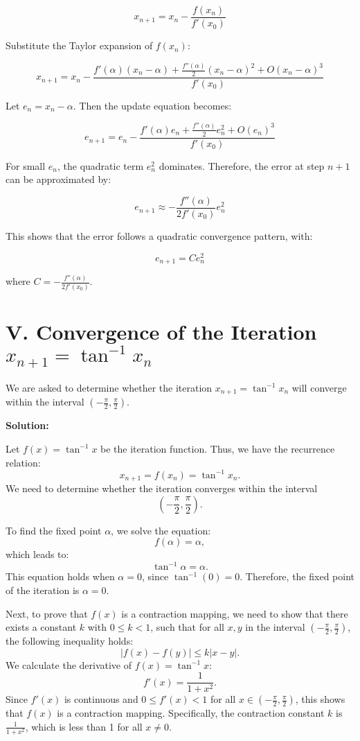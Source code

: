 \documentclass[a4paper]{article}
\begin{document}
\[
x_{n+1} = x_n - \frac{f(x_n)}{f'(x_0)}
\]

Substitute the Taylor expansion of \( f(x_n) \):

\[
x_{n+1} = x_n - \frac{f'(\alpha)(x_n - \alpha) + \frac{f''(\alpha)}{2}(x_n - \alpha)^2+ O(x_n - \alpha)^3}{f'(x_0)}
\]

Let \( e_n = x_n - \alpha \). Then the update equation becomes:

\[
e_{n+1} = e_n - \frac{f'(\alpha)e_n + \frac{f''(\alpha)}{2}e_n^2+ O(e_n)^3}{f'(x_0)}
\]


For small \( e_n \), the quadratic term \( e_n^2 \) dominates. Therefore, the error at step \( n+1 \) can be approximated by:

\[
e_{n+1} \approx - \frac{f''(\alpha)}{2 f'(x_0)} e_n^2
\]

This shows that the error follows a quadratic convergence pattern, with:

\[
e_{n+1} = C e_n^2
\]

where \( C = - \frac{f''(\alpha)}{2 f'(x_0)} \).

\section*{V. Convergence of the Iteration $x_{n+1} = \tan^{-1}x_n$}

We are asked to determine whether the iteration $x_{n+1} = \tan^{-1} x_n$ will converge within the interval $\left(-\frac{\pi}{2}, \frac{\pi}{2}\right).$


\textbf{Solution:}

Let $f(x) = \tan^{-1} x$ be the iteration function. Thus, we have the recurrence relation:
\[
x_{n+1} = f(x_n) = \tan^{-1} x_n.
\]
We need to determine whether the iteration converges within the interval 
\[
\left(-\frac{\pi}{2}, \frac{\pi}{2}\right).
\]

To find the fixed point $\alpha$, we solve the equation:
\[
f(\alpha) = \alpha,
\]
which leads to:
\[
\tan^{-1} \alpha = \alpha.
\]
This equation holds when $\alpha = 0$, since $\tan^{-1}(0) = 0$. Therefore, the fixed point of the iteration is $\alpha = 0$.

Next, to prove that $f(x)$ is a contraction mapping, we need to show that there exists a constant $k$ with $0 \leq k < 1$, such that for all $x, y$ in the interval $\left(-\frac{\pi}{2}, \frac{\pi}{2}\right)$, the following inequality holds:
\[
|f(x) - f(y)| \leq k |x - y|.
\]
We calculate the derivative of $f(x) = \tan^{-1}x$:
\[
f'(x) = \frac{1}{1 + x^2}.
\]
Since $f'(x)$ is continuous and $0 \leq f'(x) < 1$ for all $x \in \left(-\frac{\pi}{2}, \frac{\pi}{2}\right)$, this shows that $f(x)$ is a contraction mapping. Specifically, the contraction constant $k$ is $\frac{1}{1 + x^2}$, which is less than 1 for all $x \neq 0$.
\end{document}
